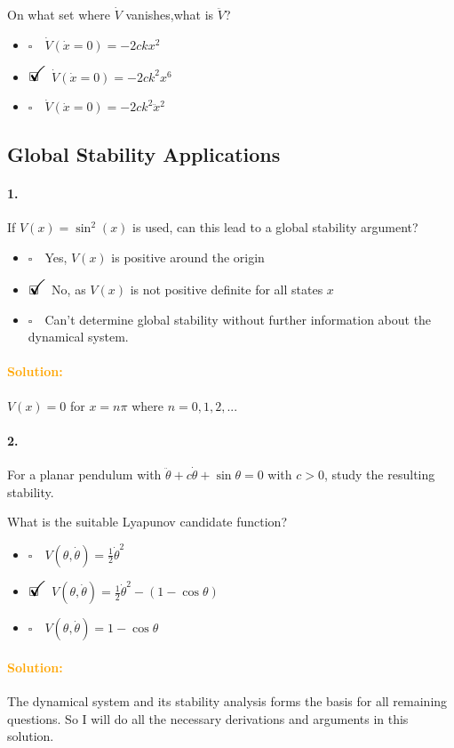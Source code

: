 \documentclass[12pt, a4paper]{article}
\newcommand{\ans}{\item[]$\rlap{\LARGE{\checkmark}}\square\quad$}
\newcommand{\noans}{\item[]$\square\quad$}
\begin{document}
On what set where $\dot{V}$ vanishes,what is $\ddot{V}$?

\begin{itemize}
    \noans $\dot{V}(\dot{x}=0) = -2ckx^{2}$
    \ans $\dot{V}(\dot{x}=0) = -2ck^{2}x^{6}$
    \noans $\dot{V}(\dot{x}=0) = -2ck^{2}\ddot{x}^{2}$
\end{itemize}

\newpage
\subsection{Global Stability Applications}
\paragraph{1.}
If $V(x) = \sin^{2}(x)$ is used, can this lead to a global stability argument?

\begin{itemize}
    \noans Yes, $V(x)$ is positive around the origin
    \ans No, as $V(x)$ is not positive definite for all states $x$
    \noans Can't determine global stability without further information about the dynamical system.
\end{itemize}

\paragraph{\textcolor{orange}{Solution:}}$V(x)=0$ for $x=n\pi$ where $n=0,1,2,...$ 

\paragraph{2.}
For a planar pendulum with $\ddot{\theta}+c\dot{\theta}+\sin\theta = 0$ with $c>0$, study the resulting stability. \medskip

What is the suitable Lyapunov candidate function?

\begin{itemize}
    \noans $V(\theta,\dot{\theta}) = \frac{1}{2}\dot{\theta}^{2}$
    \ans $V(\theta,\dot{\theta}) = \frac{1}{2}\dot{\theta}^{2} - (1-\cos\theta)$
    \noans $V(\theta,\dot{\theta}) = 1-\cos\theta$
\end{itemize}

\paragraph{\textcolor{orange}{Solution:}}The dynamical system and its stability analysis forms the basis for all remaining questions. So I will do all the necessary derivations and arguments in this solution.
\end{document}
